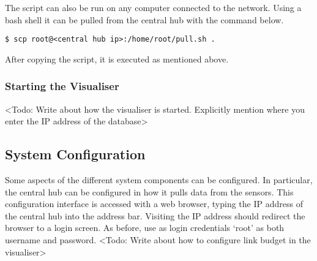 \documentclass[../document.tex]{subfiles}
\begin{document}
The script can also be run on any computer connected to the network. Using a bash shell it can be pulled from the central hub with the command below.
\lstset{style=custombash}
\begin{lstlisting}[caption=Bash command to copy the central hub script. Note the period at the end.]
$ scp root@<central hub ip>:/home/root/pull.sh .
\end{lstlisting}
After copying the script, it is executed as mentioned above.

\subsubsection{Starting the Visualiser}
{\color{red} <Todo: Write about how the visualiser is started. Explicitly mention where you enter the IP address of the database>}


\subsection{System Configuration}
Some aspects of the different system components can be configured. In particular, the central hub can be configured in how it pulls data from the sensors. This configuration interface is accessed with a web browser, typing the IP address of the central hub into the address bar. Visiting the IP address should redirect the browser to a login screen. As before, use as login credentials ‘root’ as both username and password.
{\color{red} <Todo: Write about how to configure link budget in the visualiser>}
\end{document}

